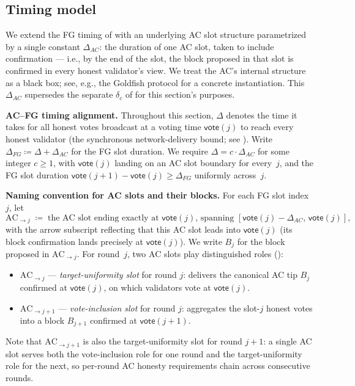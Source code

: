 \ifx\litemode\undefined\documentclass{article}\fi
\newcommand{\vote}{\mathsf{vote}}
\renewcommand{\paragraph}[1]{\vspace{7pt}\noindent\textbf{#1}}
\theoremstyle{plain}
\theoremstyle{definition}
\theoremstyle{remark}
\begin{document}
\subsection{Timing model}\label{rev:subsec:per-round-timing}

We extend the FG timing of  with an underlying AC slot structure parametrized by a single constant $\Delta_{AC}$: the duration of one AC slot, taken to include confirmation --- i.e., by the end of the slot, the block proposed in that slot is confirmed in every honest validator's view. We treat the AC's internal structure as a black box; see, e.g., the Goldfish protocol for a concrete instantiation. This $\Delta_{AC}$ supersedes the separate $\delta_c$ of  for this section's purposes.

\paragraph{AC--FG timing alignment.}
Throughout this section, $\Delta$ denotes the time it takes for all honest votes broadcast at a voting time $\vote(j)$ to reach every honest validator (the synchronous network-delivery bound; see ). Write $\Delta_{FG} \coloneqq \Delta + \Delta_{AC}$ for the FG slot duration. We require $\Delta = c \cdot \Delta_{AC}$ for some integer $c \geq 1$, with $\vote(j)$ landing on an AC slot boundary for every~$j$, and the FG slot duration $\vote(j+1) - \vote(j) \geq \Delta_{FG}$ uniformly across~$j$.

\paragraph{Naming convention for AC slots and their blocks.}
For each FG slot index $j$, let
\[
  \mathrm{AC}_{\to j} \;\coloneqq\; \text{the AC slot ending exactly at $\vote(j)$, spanning $[\vote(j) - \Delta_{AC},\, \vote(j)]$,}
\]
with the arrow subscript reflecting that this AC slot leads into $\vote(j)$ (its block confirmation lands precisely at $\vote(j)$). We write $B_j$ for the block proposed in $\mathrm{AC}_{\to j}$. For round~$j$, two AC slots play distinguished roles ():
\begin{itemize}
  \item $\mathrm{AC}_{\to j}$ --- \emph{target-uniformity slot} for round $j$: delivers the canonical AC tip $B_j$ confirmed at $\vote(j)$, on which validators vote at $\vote(j)$.
  \item $\mathrm{AC}_{\to j+1}$ --- \emph{vote-inclusion slot} for round $j$: aggregates the slot-$j$ honest votes into a block $B_{j+1}$ confirmed at $\vote(j+1)$.
\end{itemize}
Note that $\mathrm{AC}_{\to j+1}$ is also the target-uniformity slot for round $j+1$: a single AC slot serves both the vote-inclusion role for one round and the target-uniformity role for the next, so per-round AC honesty requirements chain across consecutive rounds.
\end{document}
